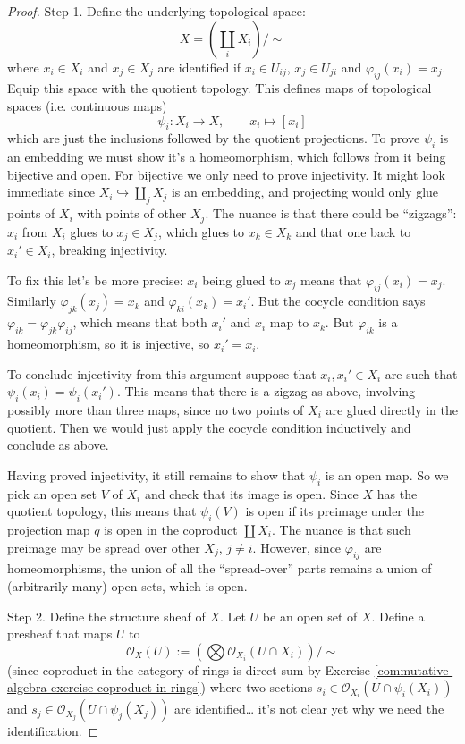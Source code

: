 \begin{proof}
Step 1. Define the underlying topological 
space:
$$
X = (\coprod_{i} X_i)/\sim
$$
where $x_i \in X_i$ and $x_j \in X_j$
are identified if $x_i \in U_{ij}$,
$x_j \in U_{ji}$ and $\varphi_{ij}(x_i)=x_j$.
Equip this space with the quotient topology.
This defines maps of topological spaces
(i.e. continuous maps)
$$
\psi_i: X_i \to X,\qquad 
x_i \mapsto [x_i]
$$
which are just the inclusions followed
by the quotient projections.
To prove $\psi_i$ is an embedding
we must show it's a homeomorphism, which
follows from it being bijective and open.
For bijective we only need to prove
injectivity. It might look immediate since
$X_i \hookrightarrow \coprod_j X_j$ is an
embedding, and projecting would only glue
points of $X_i$ with points of other $X_j$.
The nuance is that there could be
``zigzags'': $x_i$ from $X_i$ glues to
$x_j \in X_j$, which glues to $x_k \in X_k$
and that one back to $x_i' \in X_i$,
breaking injectivity.

To fix this let's be more precise:
$x_i$ being glued to $x_j$ means that
$\varphi_{ij}(x_i) = x_j$.
Similarly $\varphi_{j k}(x_j) = x_k$
and $\varphi_{ki}(x_k)=x_i'$.
But the cocycle condition says
$\varphi_{ik}=\varphi_{jk}\varphi_{ij}$,
which means that both $x_i'$ and $x_i$
map to $x_k$. But $\varphi_{ik}$ is a
homeomorphism, so it is injective, so
$x_i'=x_i$.

To conclude injectivity from this argument
suppose that $x_i, x_i' \in X_i$
are such that $\psi_i(x_i) = \psi_i(x_i')$.
This means that there is a zigzag as above,
involving possibly more than three maps,
since no two points of $X_i$ are
glued directly in the quotient.
Then we would just apply the cocycle
condition inductively and conclude as above.

Having proved injectivity, it still
remains to show that $\psi_i$ is an open map.
So we pick an open set $V$ of
$X_i$ and check that its image is open.
Since $X$ has the quotient topology,
this means that $\psi_i(V)$ is open
if its preimage under the projection map
$q$ is open in the coproduct $\coprod X_i$.
The nuance is that such preimage
may be spread over other $X_j$, 
$j\neq i$. However, since $\varphi_{ij}$
are homeomorphisms, the union of all
the ``spread-over'' parts remains a union
of (arbitrarily many) open sets, which is
open.

Step 2. Define the structure sheaf of $X$.
Let $U$ be an open set of $X$. Define
a presheaf that maps $U$ to 
$$
\mathcal{O}_X(U)
:=
(\bigotimes \mathcal{O}_{X_i}(U \cap X_i))
/\sim
$$
(since coproduct in the category
of rings is direct sum
by Exercise
\ref{commutative-algebra-exercise-coproduct-in-rings})
where two sections $s_i \in
\mathcal{O}_{X_i}(U \cap \psi_i(X_i))$
and $s_j \in \mathcal{O}_{X_j}(U \cap
\psi_j(X_j))$ 
are identified… it's not clear yet
why we need the identification.


\end{proof}
